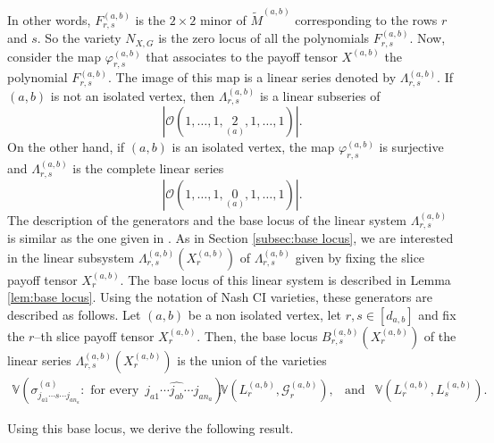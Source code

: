 \documentclass[11pt]{amsart}
\numberwithin{equation}{section}
\theoremstyle{plain}
\numberwithin{theorem}{section}
\theoremstyle{definition}
\begin{document}
In other words, $F^{(a,b)}_{r,s}$ is the $2\times2$ minor of $\widetilde{M}^{(a,b)}$ corresponding to the rows $r$ and $s$. So the variety $N_{X,G}$ is the zero locus of all the polynomials $F^{(a,b)}_{r,s}$. Now, consider the map $\varphi^{(a,b)}_{r,s}$ that associates to the payoff tensor $X^{(a,b)}$ the polynomial
$F^{(a,b)}_{r,s}$. The image of this map is a linear series denoted by  $\Lambda_{r,s}^{(a,b)}$. If $(a,b)$ is not an isolated vertex, then $\Lambda_{r,s}^{(a,b)}$ is a linear subseries of $$|\mathcal{O}(1,\ldots,1,\underset{(a)}{2},1,\ldots,1)|.$$ On the other hand, if $(a,b)$ is an isolated vertex, the map $\varphi^{(a,b)}_{r,s}$  is surjective and $\Lambda_{r,s}^{(a,b)}$ is the complete linear series 
$$|\mathcal{O}(1,\ldots,1,\underset{(a)}{0},1,\ldots,1)|.$$ 
The description of the generators and the base locus of the linear system $\Lambda_{r,s}^{(a,b)}$ is similar as the one given in  \cite[Lemma 7, Lemma 8]{portakal2024game}. As in Section \ref{subsec:base locus}, we are interested in the linear subsystem $\Lambda_{r,s}^{(a,b)}(X^{(a,b)}_r)$ of $\Lambda_{r,s}^{(a,b)}$ given by fixing the slice payoff tensor $X_r^{(a,b)}$. The base locus of this linear system is described in Lemma \ref{lem:base locus}. Using the notation of Nash CI varieties, these generators are described as follows. Let $(a,b)$ be a non isolated vertex, let $r,s\in[d_{a,b}]$ and fix the $r$--th slice payoff tensor $X_r^{(a,b)}$. Then, the base locus $B_{r,s}^{(a,b)}(X_r^{(a,b)})$ of the linear series  $\Lambda_{r,s}^{(a,b)}(X_r^{(a,b)})$ is the union of the varieties
\begin{equation}\label{eq:base locus nash}
\begin{array}{cccc}
\mathbb{V}(\sigma^{(a)}_{j_{a1}\cdots s\cdots j_{an_a}} :\text{ for every }\, j_{a1}\cdots \widehat{j_{ab}}\cdots j_{an_a}),&\mathbb{V}(L_r^{(a,b)},\mathcal G_r^{(a,b)}),& \text{and}&\mathbb{V}(L_r^{(a,b)},L_s^{(a,b)}).
\end{array}
\end{equation}

Using this base locus, we derive the following result.
\end{document}
